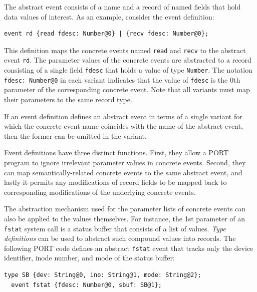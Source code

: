 The abstract event consists of a name and a record of named fields that hold data values of interest. As an example, consider the event definition:
\begin{lstlisting}[numbers=none,xleftmargin=0em,gobble=2,columns=strict]
  event rd {read fdesc: Number@0} | {recv fdesc: Number@0};
\end{lstlisting}
This definition maps the concrete events named \lstinline+read+ and \lstinline+recv+ to the abstract event \lstinline+rd+. The parameter values of the concrete events are abstracted to a record consisting of a single field \lstinline+fdesc+ that holds a value of type \lstinline+Number+. The notation \lstinline+fdesc: Number@0+ in each variant indicates that the value of \lstinline+fdesc+ is the 0th parameter of the corresponding concrete event. Note that all variants must map their parameters to the same record type.

If an event definition defines an abstract event in terms of a single variant for which the concrete event name coincides with the name of the abstract event, then the former can be omitted in the variant.

Event definitions have three distinct functions. First, they allow a PORT program to ignore
irrelevant parameter values in concrete events. Second, they can map semantically-related concrete events to the same abstract event, and lastly it permits any modifications of record fields to be mapped back to corresponding modifications of the underlying concrete events.

The abstraction mechanism used for the parameter lists of concrete events can also be applied to the values themselves. For instance, the 1st parameter of an \lstinline+fstat+ system call is a status buffer that consists of a list of values. \emph{Type definitions} can be used to abstract such compound values into records. The following PORT code defines an abstract \lstinline+fstat+ event that tracks only the device identifier, inode number, and mode of the status buffer:
\begin{lstlisting}[numbers=none,xleftmargin=0em,gobble=2]
  type SB {dev: String@0, ino: String@1, mode: String@2};
  event fstat {fdesc: Number@0, sbuf: SB@1};
\end{lstlisting}

